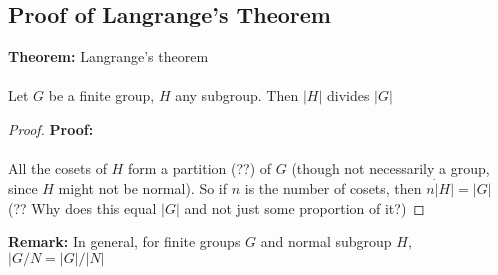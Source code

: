 \documentclass{article}
\begin{document}
\subsection{Proof of Langrange's Theorem}

\begin{theorem} 
\textbf{Theorem:} {\color{blue} Langrange's theorem} \\
~\\
Let $G$ be a finite group, $H$ any subgroup. Then $|H|$ divides $|G|$
\end{theorem}
\begin{proof} 
\textbf{Proof:} \\
~\\
All the cosets of $H$ form a partition (??) of $G$ (though not necessarily a group, since $H$ might not be normal). So if $n$ is the number of cosets, then $n\dot |H|=|G|$ (?? Why does this equal $|G|$ and not just some proportion of it?)
\end{proof}
\begin{remark} 
	\textbf{Remark:} In general, for finite groups $G$ and normal subgroup $H$, $|G /N = |G| /|N|$ 
\end{remark}
\end{document}
